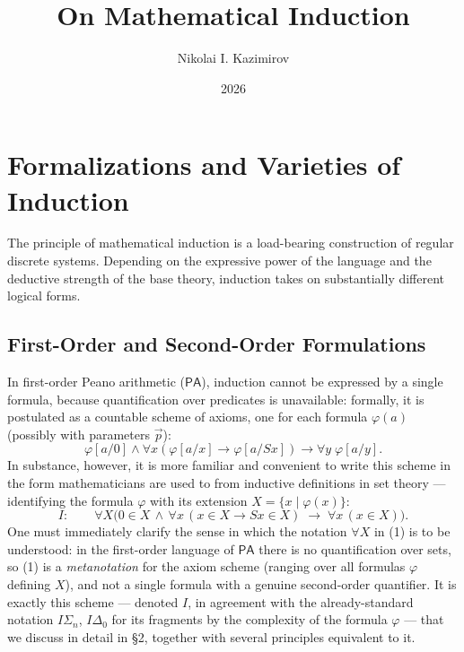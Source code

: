 \documentclass[12pt,a4paper]{article}
\theoremstyle{plain}
\theoremstyle{definition}
\newcommand{\ph}{\varphi}
\newcommand{\toinf}{\rightarrow}
\newcommand{\PA}{\textsf{PA}}
\begin{document}
\title{\textbf{On Mathematical Induction}}
\author{Nikolai I. Kazimirov}
\date{2026}
\maketitle
\tableofcontents
\bigskip

\section{Formalizations and Varieties of Induction}

The principle of mathematical induction is a load-bearing construction of regular discrete systems. Depending on the expressive power of the language and the deductive strength of the base theory, induction takes on substantially different logical forms.

\subsection{First-Order and Second-Order Formulations}
In first-order Peano arithmetic ($\PA$), induction cannot be expressed by a single formula, because quantification over predicates is unavailable: formally, it is postulated as a countable scheme of axioms, one for each formula $\ph(a)$ (possibly with parameters $\vec p$):
$$\ph[a/0] \land \forall x (\ph[a/x] \toinf \ph[a/Sx]) \toinf \forall y \; \ph[a/y].$$
In substance, however, it is more familiar and convenient to write this scheme in the form mathematicians are used to from inductive definitions in set theory --- identifying the formula $\ph$ with its extension $X=\{x \mid \ph(x)\}$:
\begin{equation}
    I:\qquad \forall X \Big(0\in X \,\land\, \forall x\,(x\in X \toinf Sx\in X) \;\toinf\; \forall x\,(x\in X)\Big).
\end{equation}
One must immediately clarify the sense in which the notation $\forall X$ in (1) is to be understood: in the first-order language of $\PA$ there is no quantification over sets, so (1) is a \emph{metanotation} for the axiom scheme (ranging over all formulas $\ph$ defining $X$), and not a single formula with a genuine second-order quantifier. It is exactly this scheme --- denoted $I$, in agreement with the already-standard notation $I\Sigma_n$, $I\Delta_0$ for its fragments by the complexity of the formula $\ph$ --- that we discuss in detail in §2, together with several principles equivalent to it.
\end{document}
